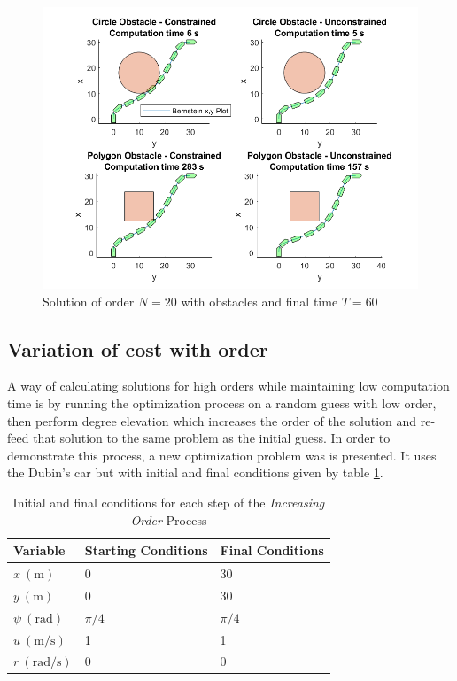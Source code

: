 \begin{figure}[h!]
\centering
\includegraphics[width=\textwidth]{Images/results/ostaclesfigures.png}
\caption{Solution of order $N=20$ with obstacles and final time $T=60$}
\label{fig:obstaclesfigures}
\end{figure}


\subsection{Variation of cost with order}

\par A way of calculating solutions for high orders while maintaining low computation time is by running the optimization process on a random guess with low order, then perform degree elevation which increases the order of the solution and re-feed that solution to the same problem as the initial guess. In order to demonstrate this process, a new optimization problem was is presented. It uses the Dubin's car but with initial and final conditions given by table \ref{tab:increasingNproblem}. 

\begin{table}[h!]
\centering
\begin{tabular}{|l|l|l|}
\hline
Variable & Starting Conditions & Final Conditions \\ \hline
$x\ (\si{\meter})$ & 0 & 30 \\
$y\ (\si{\meter})$ & 0 & 30 \\
$\psi\ (\si{\radian})$ & $\pi/4$ & $\pi/4$ \\
$u\ (\si{\meter\per\second})$ & 1 & 1 \\
$r\ (\si{\radian\per\second})$ & 0 & 0 \\
\hline
\end{tabular}
\caption{Initial and final conditions for each step of the \textit{Increasing Order} Process}
\label{tab:increasingNproblem}
\end{table}


